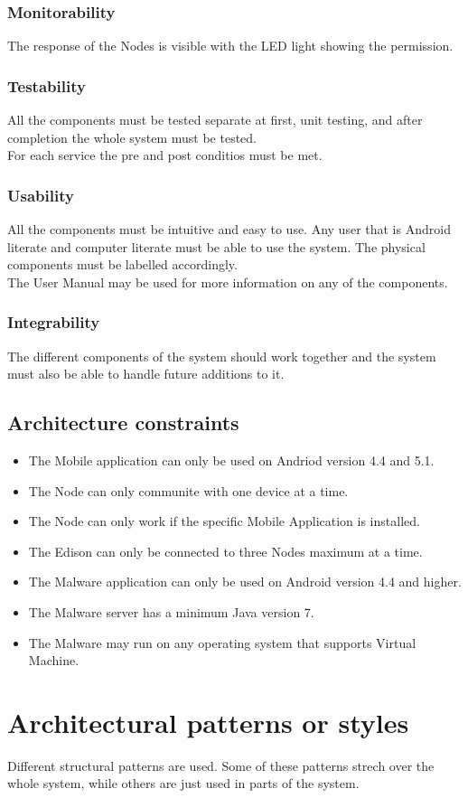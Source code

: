 \documentclass[a4paper,12pt,titlepage]{article}
\begin{document}
\subsubsection{Monitorability}
The response of the Nodes is visible with the LED light showing the permission.

\subsubsection{Testability}
All the components must be tested separate at first, unit testing, and after completion the whole system must be tested.
\\ For each service the pre and post conditios must be met.

\subsubsection{Usability}
All the components must be intuitive and easy to use. Any user that is Android literate and computer literate must be able to use the system. The physical components must be labelled accordingly. 
\\ The User Manual may be used for more information on any of the components. 

\subsubsection{Integrability}
The different components of the system should work together and the system must also be able to handle future additions to it.\\

\subsection{Architecture constraints}
	\begin{itemize}
		\item The Mobile application can only be used on Andriod version 4.4 and 5.1.
		\item The Node can only communite with one device at a time.
		\item The Node can only work if the specific Mobile Application is installed.
		\item The Edison  can only be connected to three Nodes maximum at a time.
		\item The Malware application can only be used on Android version 4.4 and higher.
		\item The Malware server has a minimum Java version 7.
		\item The Malware may run on any operating system that supports Virtual Machine.

	\end{itemize}
\newpage	\section{Architectural patterns or styles}
Different structural patterns are used. Some of these patterns strech over the whole system, while others are just used in parts of the system.
\end{document}
